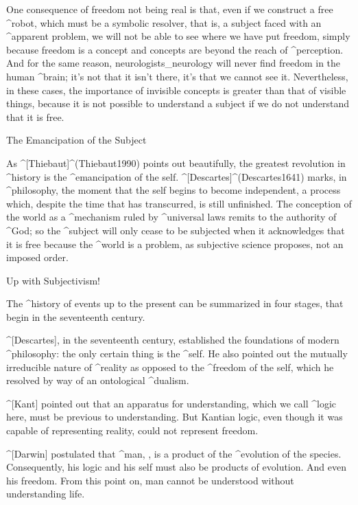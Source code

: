 One consequence of freedom not being real is that, even if we construct
a free ^{robot}, which must be a symbolic resolver, that is, a subject
faced with an ^{apparent problem}, we will not be able to see where we
have put freedom, simply because freedom is a concept and concepts are
beyond the reach of ^{perception}. And for the same reason,
neurologists_{neurology} will never find freedom in the human ^{brain};
it's not that it isn't there, it's that we cannot see it. Nevertheless,
in these cases, the importance of invisible concepts is greater than
that of visible things, because it is not possible to understand a
subject if we do not understand that it is free.


\Section The Emancipation of the Subject

As ^[Thiebaut]^(Thiebaut1990) points out beautifully, the greatest
revolution in ^{history} is the ^{emancipation} of the self.
^[Descartes]^(Descartes1641) marks, in ^{philosophy}, the moment that
the self begins to become independent, a process which, despite the time
that has transcurred, is still unfinished. The conception of the world
as a ^{mechanism} ruled by ^{universal laws} remits to the authority of
^{God}; so the ^{subject} will only cease to be subjected when it
acknowledges that it is free because the ^{world} is a problem, as
subjective science proposes, not an imposed order.


\Section Up with Subjectivism!

The ^{history} of events up to the present can be summarized in four
stages, that begin in the seventeenth century.

 ^[Descartes], in the seventeenth century, established
the foundations of modern ^{philosophy}: the only certain thing is the
^{self}. He also pointed out the mutually irreducible nature of
^{reality} as opposed to the ^{freedom} of the self, which he resolved
by way of an ontological ^{dualism}.

 ^[Kant] pointed out that an apparatus for understanding,
which we call ^{logic} here, must be previous to understanding. But
Kantian logic, even though it was capable of representing reality, could
not represent freedom.

 ^[Darwin] postulated that ^{man}, ,
is a product of the ^{evolution} of the species. Consequently, his logic
and his self must also be products of evolution. And even his freedom.
From this point on, man cannot be understood without understanding life.

